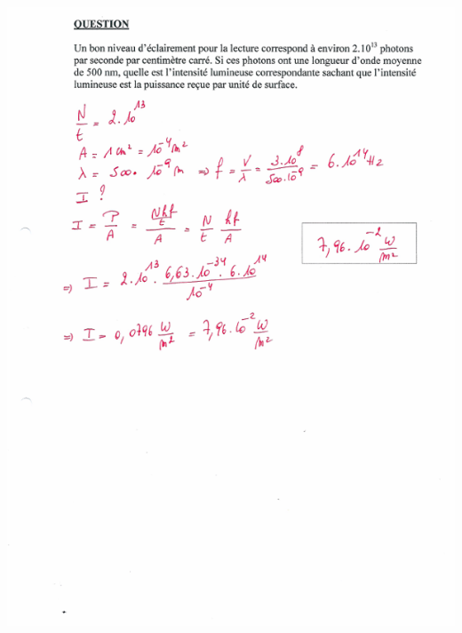 {{{\includegraphics[width=17.498cm,height=24.13cm]{Pictures/10000001000002570000033BCFBA7D32EF4FFF20.png}

}}}
